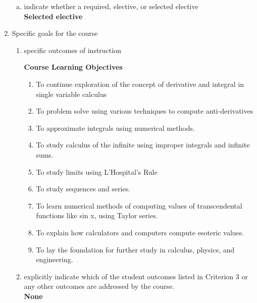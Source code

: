 \begin{enumerate}[1.]
\begin{enumerate}[a.]
\item indicate whether a required, elective, or selected elective\\ %
  {\bfseries
    Selected elective
  }

\end{enumerate}

\item Specific goals for the course
\begin{enumerate}
\item specific outcomes of instruction\\ %
  {\bfseries
    Course Learning Objectives
    \begin{enumerate}[1.]
    \item To continue exploration of the concept of derivative and integral in single variable calculus
    \item To problem solve using various techniques to compute anti-derivatives
    \item To approximate integrals using numerical methods.
    \item To study calculus of the infinite using improper integrals and infinite sums.
    \item To study limits using L’Hospital’s Rule
    \item To study sequences and series.
    \item To learn numerical methods of computing values of transcendental functions like sin x, using Taylor series.
    \item To explain how calculators and computers compute esoteric values.
    \item To lay the foundation for further study in calculus, physics, and engineering.
    \end{enumerate}
  }

\item explicitly indicate which of the student outcomes listed in Criterion 3 or any other outcomes are addressed by the course.\\
  {\bfseries
    None
  }
\end{enumerate}


\end{enumerate}
